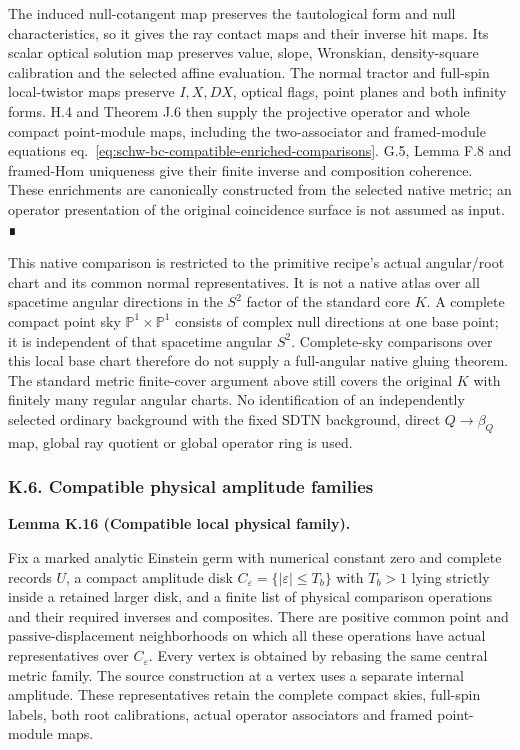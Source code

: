 \documentclass[
  english,
  11pt,
  reqno]{amsart}
\makeatletter
\newcommand{\pandocstatementheading}[1]{%
  \par\addpenalty{\@beginparpenalty}%
  \addvspace{.5\baselineskip plus .2\baselineskip minus .2\baselineskip}%
  {\normalfont\bfseries #1\par}%
  \nobreak\@afterindenttrue\@afterheading
}
\makeatother
\begin{document}
The induced null-cotangent map preserves the tautological form and null
characteristics, so it gives the ray contact maps and their inverse hit
maps. Its scalar optical solution map preserves value, slope, Wronskian,
density-square calibration and the selected affine evaluation. The
normal tractor and full-spin local-twistor maps preserve \(I,X,DX\),
optical flags, point planes and both infinity forms. H.4 and Theorem J.6
then supply the projective operator and whole compact point-module maps,
including the two-associator and framed-module equations
eq.~\ref{eq:schw-bc-compatible-enriched-comparisons}. G.5, Lemma F.8 and
framed-Hom uniqueness give their finite inverse and composition
coherence. These enrichments are canonically constructed from the
selected native metric; an operator presentation of the original
coincidence surface is not assumed as input. ∎

This native comparison is restricted to the primitive recipe's actual
angular/root chart and its common normal representatives. It is not a
native atlas over all spacetime angular directions in the \(S^2\) factor
of the standard core \(K\). A complete compact point sky
\(\mathbb P^1\times\mathbb P^1\) consists of complex null directions at
one base point; it is independent of that spacetime angular \(S^2\).
Complete-sky comparisons over this local base chart therefore do not
supply a full-angular native gluing theorem. The standard metric
finite-cover argument above still covers the original \(K\) with
finitely many regular angular charts. No identification of an
independently selected ordinary background with the fixed SDTN
background, direct \(Q\to\beta_Q\) map, global ray quotient or global
operator ring is used.

\protect{}\label{lem:schw-bc-compatible-local-amplitude}

\subsubsection{K.6. Compatible physical amplitude
families}\label{k.6.-compatible-physical-amplitude-families}

\pandocstatementheading{Lemma K.16 (Compatible local physical family).}

Fix a marked analytic Einstein germ with numerical constant zero and
complete records \(U\), a compact amplitude disk
\(C_\varepsilon=\{|\varepsilon|\le T_b\}\) with \(T_b>1\) lying strictly
inside a retained larger disk, and a finite list of physical comparison
operations and their required inverses and composites. There are
positive common point and passive-displacement neighborhoods on which
all these operations have actual representatives over \(C_\varepsilon\).
Every vertex is obtained by rebasing the same central metric family. The
source construction at a vertex uses a separate internal amplitude.
These representatives retain the complete compact skies, full-spin
labels, both root calibrations, actual operator associators and framed
point-module maps.
\end{document}
